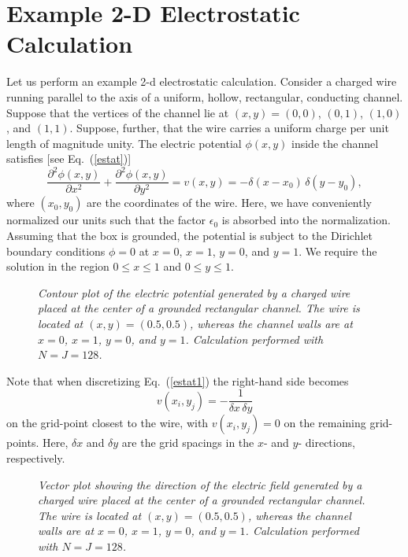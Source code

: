 \section{Example 2-D Electrostatic Calculation}
Let us perform an example 2-d electrostatic calculation. Consider a charged wire
running parallel to the axis of a uniform, hollow, rectangular, conducting channel.
Suppose that the vertices of the channel lie at $(x,y) = (0,0)$, $(0,1)$, $(1,0)$, and $(1,1)$.
Suppose, further, that the wire carries a uniform charge per unit length of magnitude unity.
The electric potential $\phi(x,y)$ inside the channel satisfies [see Eq.~(\ref{estat})]
\begin{equation}\label{estat1}
\frac{\partial^2 \phi(x,y)}{\partial x^2}+\frac{\partial^2 \phi(x,y)}{\partial y^2} =
v(x,y) =  -\delta(x-x_0)\,
\delta(y-y_0),
\end{equation}
where $(x_0, y_0)$ are the coordinates of the wire.
Here, we have conveniently normalized our units such that the factor $\epsilon_0$ is absorbed into the normalization.
Assuming that the box is grounded, the potential is
subject to the Dirichlet boundary conditions  $\phi=0$ at $x=0$, $x=1$, $y=0$, and
$y=1$. We require the solution in the region $0\leq x\leq 1$ and $0\leq y \leq 1$.

\begin{figure}
\epsfysize=3in
\centerline{}
\caption{\em Contour plot of the electric potential generated by
 a charged wire placed at the center of a grounded
rectangular channel. The wire is located at $(x,y)=(0.5,0.5)$, whereas the
channel walls are at $x=0$, $x=1$, $y=0$, and $y=1$.
Calculation performed with $N=J=128$.}\label{coub1}
\end{figure}

Note that when discretizing Eq.~(\ref{estat1}) the right-hand side becomes
\begin{equation}
v(x_i, y_j) = -\frac{1}{\delta x\,\delta y}
\end{equation}
on the grid-point closest to the wire, with $v(x_i, y_j) = 0$ on the remaining grid-points.
Here,  $\delta x$ and $\delta y$ are the grid spacings in the $x$- and
$y$- directions, respectively.

\begin{figure}
\epsfysize=3in
\centerline{}
\caption{\em  Vector plot showing the direction of the electric field generated by a charged wire placed at the center of a grounded
rectangular channel. The wire is located at $(x,y)=(0.5,0.5)$, whereas the
channel walls are at $x=0$, $x=1$, $y=0$, and $y=1$. Calculation performed with $N=J=128$.}\label{coub2}
\end{figure}

